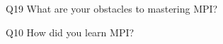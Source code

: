 \begin{description}%
\item{Q19} What are your obstacles to mastering MPI?%
\item{Q10} How did you learn MPI?%
\end{description}%
